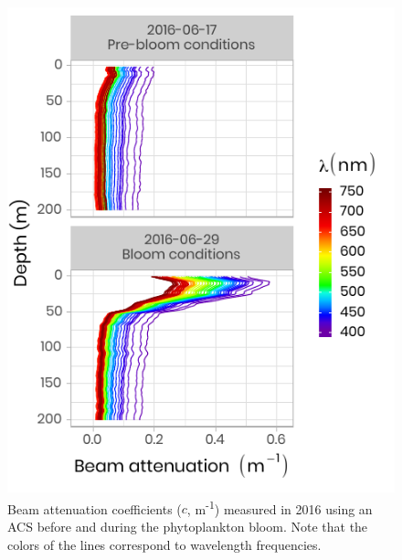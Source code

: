 \documentclass[12pt,a4paper]{scrartcl}
\begin{document}
\begin{figure}[h]
	\centering
	\includegraphics[scale = 1]{../../../graphs/fig07.pdf}
	\caption{Beam attenuation coefficients ($c$, m\textsuperscript{-1}) measured in 2016 using an ACS before and during the phytoplankton bloom. Note that the colors of the lines correspond to wavelength frequencies.}
\end{figure}

\clearpage
\newpage
\end{document}
